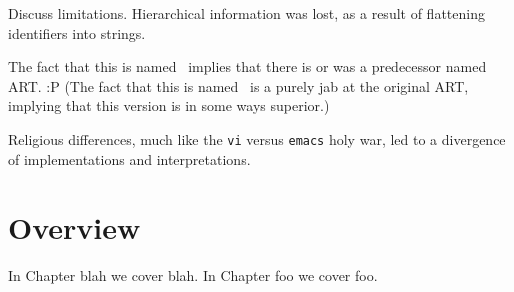 Discuss limitations.  
Hierarchical information was lost, as a result of 
flattening identifiers into strings.  

The fact that this is named \artxx\ implies that there is or was a 
predecessor named ART.  :P
(The fact that this is named \artxx\ is a purely jab at the original ART, 
implying that this version is in some ways superior.)

Religious differences, much like the
\texttt{vi} versus \texttt{emacs} holy war, 
led to a divergence of implementations and interpretations.  


\section{Overview}
\label{sec:intro:overview}

In Chapter blah we cover blah.  
In Chapter foo we cover foo.  



